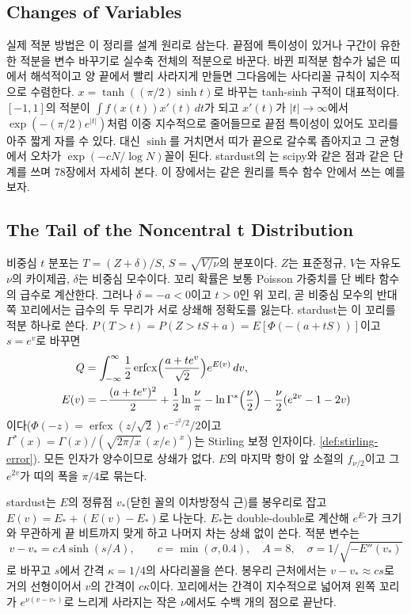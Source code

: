 \subsection{Changes of Variables}

실제 적분 방법은 이 정리를 설계 원리로 삼는다. 끝점에 특이성이 있거나 구간이 유한한 적분을 변수 바꾸기로 실수축 전체의 적분으로 바꾼다. 바뀐 피적분 함수가 넓은 띠에서 해석적이고 양 끝에서 빨리 사라지게 만들면 그다음에는 사다리꼴 규칙이 지수적으로 수렴한다. $x=\tanh((\pi/2)\sinh t)$로 바꾸는 tanh-sinh 구적\cite{takahasi1974}이 대표적이다. $[-1,1]$의 적분이 $\int f(x(t))x'(t)\,dt$가 되고 $x'(t)$가 $|t|\to\infty$에서 $\exp(-(\pi/2)e^{|t|})$처럼 이중 지수적으로 줄어들므로 끝점 특이성이 있어도 꼬리를 아주 짧게 자를 수 있다. 대신 $\sinh$를 거치면서 띠가 끝으로 갈수록 좁아지고 그 균형에서 오차가 $\exp(-cN/\log N)$꼴이 된다\cite{mori2001}. stardust의 는 scipy와 같은 점과 같은 단계를 쓰며 78장에서 자세히 본다. 이 장에서는 같은 원리를 특수 함수 안에서 쓰는 예를 보자.

\subsection{The Tail of the Noncentral t Distribution}
\label{sec:nct-trap}

비중심 $t$ 분포는 $T=(Z+\delta)/S$, $S=\sqrt{V/\nu}$의 분포이다. $Z$는 표준정규, $V$는 자유도 $\nu$의 카이제곱, $\delta$는 비중심 모수이다. 꼬리 확률은 보통 Poisson 가중치를 단 베타 함수의 급수로 계산한다. 그러나 $\delta=-a<0$이고 $t>0$인 위 꼬리, 곧 비중심 모수의 반대쪽 꼬리에서는 급수의 두 무리가 서로 상쇄해 정확도를 잃는다. stardust는 이 꼬리를 적분 하나로 쓴다. $P(T>t)=P(Z>tS+a)=E[\Phi(-(a+tS))]$이고 $s=e^v$로 바꾸면
\begin{equation}
\label{eq:nct-integral}
\begin{aligned}
Q&=\int_{-\infty}^\infty\frac12\operatorname{erfcx}\Bigl(\frac{a+te^v}{\sqrt2}\Bigr)e^{E(v)}\,dv,\\
E(v)&=-\frac{(a+te^v)^2}{2}+\frac12\ln\frac\nu\pi-\ln\Gamma^*\Bigl(\frac\nu2\Bigr)-\frac\nu2(e^{2v}-1-2v)
\end{aligned}
\end{equation}
이다($\Phi(-z)=\operatorname{erfcx}(z/\sqrt2)e^{-z^2/2}/2$이고 $\Gamma^*(x)=\Gamma(x)/(\sqrt{2\pi/x}\,(x/e)^x)$는 Stirling 보정 인자이다. \cref{def:stirling-error}). 모든 인자가 양수이므로 상쇄가 없다. $E$의 마지막 항이 앞 소절의 $f_{\nu/2}$이고 그 $e^{2v}$가 띠의 폭을 $\pi/4$로 묶는다.

stardust는 $E$의 정류점 $v_*$(닫힌 꼴의 이차방정식 근)를 봉우리로 잡고 $E(v)=E_*+(E(v)-E_*)$로 나눈다. $E_*$는 double-double로 계산해 $e^{E_*}$가 크기와 무관하게 끝 비트까지 맞게 하고 나머지 차는 상쇄 없이 쓴다. 적분 변수는
\[
v-v_*=cA\sinh(s/A),\qquad c=\min(\sigma,0.4),\quad A=8,\quad\sigma=1/\sqrt{-E''(v_*)}
\]
로 바꾸고 $s$에서 간격 $\kappa=1/4$의 사다리꼴을 쓴다. 봉우리 근처에서는 $v-v_*\approx cs$로 거의 선형이어서 $v$의 간격이 $c\kappa$이다. 꼬리에서는 간격이 지수적으로 넓어져 왼쪽 꼬리가 $e^{\nu(v-v_*)}$로 느리게 사라지는 작은 $\nu$에서도 수백 개의 점으로 끝난다.

